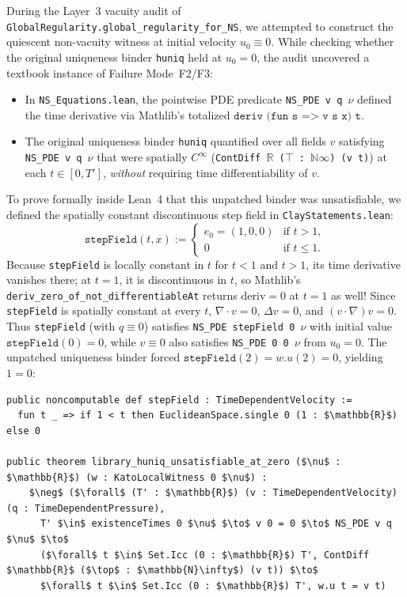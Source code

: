 \documentclass[11pt,a4paper]{article}
\theoremstyle{plain}
\theoremstyle{definition}
\begin{document}
During the Layer~3 vacuity audit of \texttt{GlobalRegularity.global\_regularity\_for\_NS}, we attempted to construct the quiescent non-vacuity witness at initial velocity $u_0 \equiv 0$. While checking whether the original uniqueness binder \texttt{huniq} held at $u_0 = 0$, the audit uncovered a textbook instance of Failure Mode~F2/F3:
\begin{itemize}[nosep]
  \item In \texttt{NS\_Equations.lean}, the pointwise PDE predicate \texttt{NS\_PDE v q $\nu$} defined the time derivative via Mathlib's totalized $\texttt{deriv (fun s => v s x) t}$.
  \item The original uniqueness binder \texttt{huniq} quantified over all fields $v$ satisfying \texttt{NS\_PDE v q $\nu$} that were spatially $C^\infty$ (\texttt{ContDiff $\mathbb{R}$ ($\top$ : $\mathbb{N}\infty$) (v t)}) at each $t \in [0, T']$, \emph{without} requiring time differentiability of $v$.
\end{itemize}

To prove formally inside Lean~4 that this unpatched binder was unsatisfiable, we defined the spatially constant discontinuous step field in \texttt{ClayStatements.lean}:
\[
  \texttt{stepField}(t, x) := \begin{cases}
    e_0 = (1, 0, 0) & \text{if } t > 1,\\
    0 & \text{if } t \le 1.
  \end{cases}
\]
Because \texttt{stepField} is locally constant in $t$ for $t < 1$ and $t > 1$, its time derivative vanishes there; at $t = 1$, it is discontinuous in $t$, so Mathlib's \texttt{deriv\_zero\_of\_not\_differentiableAt} returns $\mathrm{deriv} = 0$ at $t = 1$ as well! Since \texttt{stepField} is spatially constant at every $t$, $\nabla \cdot v = 0$, $\Delta v = 0$, and $(v \cdot \nabla)v = 0$. Thus \texttt{stepField} (with $q \equiv 0$) satisfies \texttt{NS\_PDE stepField 0 $\nu$} with initial value $\texttt{stepField}(0) = 0$, while $v \equiv 0$ also satisfies \texttt{NS\_PDE 0 0 $\nu$} from $u_0 = 0$. The unpatched uniqueness binder forced $\texttt{stepField}(2) = w.u(2) = 0$, yielding $1 = 0$:

\begin{lstlisting}[language=Lean4,caption={Formal disproof of the unpatched uniqueness binder (\texttt{ClayStatements.lean}).}]
public noncomputable def stepField : TimeDependentVelocity :=
  fun t _ => if 1 < t then EuclideanSpace.single 0 (1 : $\mathbb{R}$) else 0

public theorem library_huniq_unsatisfiable_at_zero ($\nu$ : $\mathbb{R}$) (w : KatoLocalWitness 0 $\nu$) :
    $\neg$ ($\forall$ (T' : $\mathbb{R}$) (v : TimeDependentVelocity) (q : TimeDependentPressure),
      T' $\in$ existenceTimes 0 $\nu$ $\to$ v 0 = 0 $\to$ NS_PDE v q $\nu$ $\to$
      ($\forall$ t $\in$ Set.Icc (0 : $\mathbb{R}$) T', ContDiff $\mathbb{R}$ ($\top$ : $\mathbb{N}\infty$) (v t)) $\to$
      $\forall$ t $\in$ Set.Icc (0 : $\mathbb{R}$) T', w.u t = v t)
\end{lstlisting}
\end{document}

